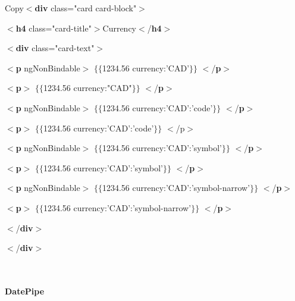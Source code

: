 \documentclass{article}
\begin{document}
\noindent Copy$\mathrm{<}$\textbf{div} class="card card-block"$\mathrm{>}$

\noindent $\mathrm{<}$\textbf{h4} class="card-title"$\mathrm{>}$Currency$\mathrm{<}$/\textbf{h4}$\mathrm{>}$

\noindent $\mathrm{<}$\textbf{div} class="card-text"$\mathrm{>}$

\noindent $\mathrm{<}$\textbf{p} ngNonBindable$\mathrm{>}$ $\mathrm{\{}$$\mathrm{\{}$1234.56 {\textbar} currency:'CAD'$\mathrm{\}}$$\mathrm{\}}$ $\mathrm{<}$/\textbf{p}$\mathrm{>}$

\noindent $\mathrm{<}$\textbf{p}$\mathrm{>}$ $\mathrm{\{}$$\mathrm{\{}$1234.56 {\textbar} currency:"CAD"$\mathrm{\}}$$\mathrm{\}}$ $\mathrm{<}$/\textbf{p}$\mathrm{>}$

\noindent $\mathrm{<}$\textbf{p} ngNonBindable$\mathrm{>}$ $\mathrm{\{}$$\mathrm{\{}$1234.56 {\textbar} currency:'CAD':'code'$\mathrm{\}}$$\mathrm{\}}$ $\mathrm{<}$/\textbf{p}$\mathrm{>}$

\noindent $\mathrm{<}$\textbf{p}$\mathrm{>}$ $\mathrm{\{}$$\mathrm{\{}$1234.56 {\textbar} currency:'CAD':'code'$\mathrm{\}}$$\mathrm{\}}$ $\mathrm{<}$/p$\mathrm{>}$

\noindent $\mathrm{<}$\textbf{p} ngNonBindable$\mathrm{>}$ $\mathrm{\{}$$\mathrm{\{}$1234.56 {\textbar} currency:'CAD':'symbol'$\mathrm{\}}$$\mathrm{\}}$ $\mathrm{<}$/\textbf{p}$\mathrm{>}$

\noindent $\mathrm{<}$\textbf{p}$\mathrm{>}$ $\mathrm{\{}$$\mathrm{\{}$1234.56 {\textbar} currency:'CAD':'symbol'$\mathrm{\}}$$\mathrm{\}}$ $\mathrm{<}$/\textbf{p}$\mathrm{>}$

\noindent $\mathrm{<}$\textbf{p} ngNonBindable$\mathrm{>}$ $\mathrm{\{}$$\mathrm{\{}$1234.56 {\textbar} currency:'CAD':'symbol-narrow'$\mathrm{\}}$$\mathrm{\}}$ $\mathrm{<}$/\textbf{p}$\mathrm{>}$

\noindent $\mathrm{<}$\textbf{p}$\mathrm{>}$ $\mathrm{\{}$$\mathrm{\{}$1234.56 {\textbar} currency:'CAD':'symbol-narrow'$\mathrm{\}}$$\mathrm{\}}$ $\mathrm{<}$/\textbf{p}$\mathrm{>}$

\noindent $\mathrm{<}$/\textbf{div}$\mathrm{>}$

\noindent $\mathrm{<}$/\textbf{div}$\mathrm{>}$

\noindent 

\noindent \\ \\ {\large \textbf{DatePipe}}

\noindent \textbf{}
\end{document}
